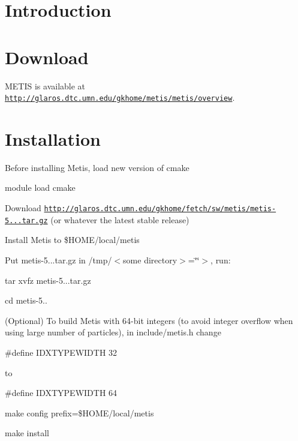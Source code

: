 \hypertarget{_p_i_l_Introduction}{}\section{Introduction}\label{_p_i_l_Introduction}
\hypertarget{metis_Download}{}\section{Download}\label{metis_Download}
M\+E\+T\+I\+S is available at \href{http://glaros.dtc.umn.edu/gkhome/metis/metis/overview}{\tt http\+://glaros.\+dtc.\+umn.\+edu/gkhome/metis/metis/overview}.\hypertarget{_p_i_l_Installation}{}\section{Installation}\label{_p_i_l_Installation}
Before installing Metis, load new version of cmake


\begin{DoxyItemize}
\item module load cmake
\end{DoxyItemize}

Download \href{http://glaros.dtc.umn.edu/gkhome/fetch/sw/metis/metis-5.0.2.tar.gz}{\tt http\+://glaros.\+dtc.\+umn.\+edu/gkhome/fetch/sw/metis/metis-\/5...\+tar.\+gz} (or whatever the latest stable release)


\begin{DoxyItemize}
\item Install Metis to \$\+H\+O\+M\+E/local/metis
\item Put metis-\/5...\+tar.\+gz in /tmp/$<$some directory$>$=\char`\"{}\char`\"{}$>$, run\+:
\begin{DoxyItemize}
\item tar xvfz metis-\/5...\+tar.\+gz
\item cd metis-\/5..
\end{DoxyItemize}
\item (Optional) To build Metis with 64-\/bit integers (to avoid integer overflow when using large number of particles), in include/metis.\+h change
\item 
\item \#define I\+D\+X\+T\+Y\+P\+E\+W\+I\+D\+T\+H 32
\item 
\item to
\item 
\item \#define I\+D\+X\+T\+Y\+P\+E\+W\+I\+D\+T\+H 64
\item 
\begin{DoxyItemize}
\item make config prefix=\$\+H\+O\+M\+E/local/metis
\item make install 
\end{DoxyItemize}
\end{DoxyItemize}